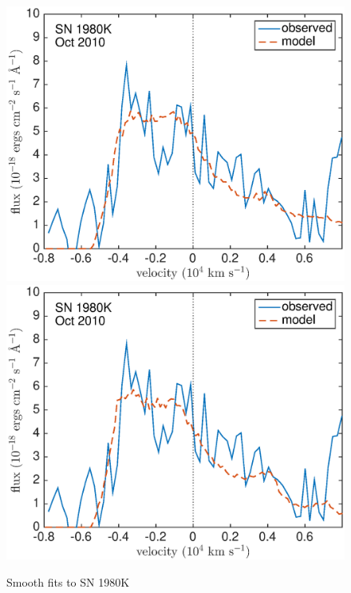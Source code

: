 \begin{figure}
\includegraphics[scale=0.4,clip=true, trim=20 0 40 20]{chapters/chapter6/figs/80K/smooth/OI}
\includegraphics[scale=0.4,clip=true, trim=20 0 40 20]{chapters/chapter6/figs/80K/smooth/OI_amC}
\caption{Smooth fits to SN 1980K}
\label{80K_smooth}
\end{figure}

